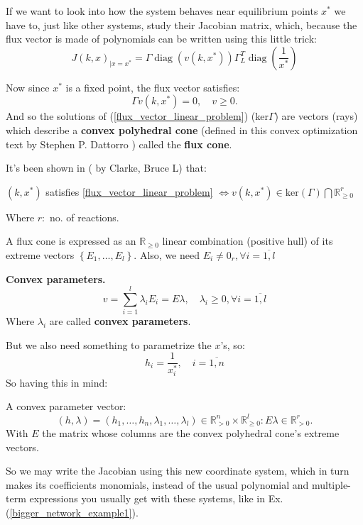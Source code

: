 If we want to look into how the system behaves near equilibrium points $x^*$ we have to, just like other systems, study their Jacobian matrix, which, because the flux vector is made of polynomials can be written using this little trick:
\[
	J(k, x)_{\mid x=x^*}=\Gamma \operatorname{diag}\left(v\left(k, x^*\right)\right) \Gamma_L^T \operatorname{diag}\left(\frac{1}{x^*}\right)
\]

Now since $x^*$ is a fixed point, the flux vector satisfies:
\begin{equation}\label{flux_vector_linear_problem}
	\Gamma v(k,x^*) = 0, \quad v \geq 0.
\end{equation}
And so the solutions of (\ref{flux_vector_linear_problem}) (ker$\Gamma$) are vectors (rays) which describe a \textbf{convex polyhedral cone} (defined in this convex optimization text by Stephen P. Dattorro \cite{dattorro2018Convex}) called the \textbf{flux cone}.

It's been shown in (\cite{clarke1980stability} by Clarke, Bruce L) that:

$(k,x^*)$ satisfies \ref{flux_vector_linear_problem} $\iff  v(k,x^*)\in \text{ker}(\Gamma) \bigcap \mathbb{R}^r_{\geq 0}$

Where $r:$ no. of reactions.

A flux cone is expressed as an $\mathbb{R}_{\geq 0}$ linear combination (positive hull) of its extreme vectors $\left\{ E_1 , \ldots , E_l \right\}$. Also, we need $E_i \neq 0_r, \forall i = \overline{1,l}$

\begin{definition}\label{convex_params_definition}
	\textbf{Convex parameters.}
	\begin{equation}\label{flux_cone}
		\boxed{		v=\sum_{i=1}^l \lambda_i E_i=E \lambda, \quad \lambda_i \geq 0, \forall i = \overline{1,l} }
	\end{equation}
	Where $\lambda_i$ are called \textbf{convex parameters}.
\end{definition}
But we also need something to parametrize the $x$'s, so:
\begin{equation}\label{other_convex_parameters}
	\boxed{	h_i=\frac{1}{x_i^*}, \quad i = \overline{1,n} }
\end{equation}
So having this in mind:
\begin{definition}
	A convex parameter vector:
	\[
		(h, \lambda) = (h_1, \ldots, h_n , \lambda_1, \ldots , \lambda_l) \in \mathbb{R}_{>0}^n \times \mathbb{R}_{\geq 0}^{l} : E \lambda \in \mathbb{R}^r_{> 0}.
	\]
	With $E$ the matrix whose columns are the convex polyhedral cone's extreme vectors.
\end{definition}
So we may write the Jacobian using this new coordinate system, which in turn makes its coefficients monomials, instead of the usual polynomial and multiple-term expressions you usually get with these systems, like in Ex. (\ref{bigger_network_example1}).
\newcommand\eqCuzConvex{\stackrel{\mathclap{\normalfont\mbox{\ref{flux_vector_linear_problem}, \ref{convex_params_definition}}}}{=\joinrel=\joinrel=\joinrel=\joinrel=}}

